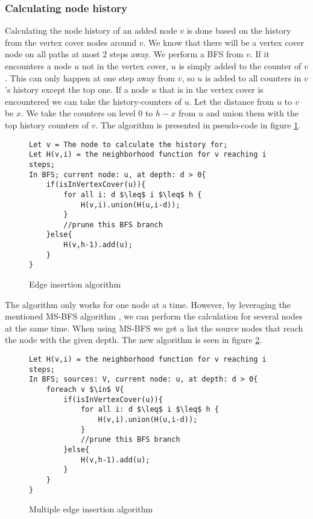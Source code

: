 \subsubsection{Calculating node history}

Calculating the node history of an added node $v$ is done based on the history from the vertex cover nodes around $v$. We know that there will be a vertex cover node on all paths at most 2 steps away. We perform a BFS from $v$. If it encounters a node $u$ not in the vertex cover, $u$ is simply added to the counter of $v$. This can only happen at one step away from $v$, so $u$ is added to all counters in $v$'s history except the top one. If a node $u$ that is in the vertex cover is encountered we can take the history-counters of $u$. Let the distance from $u$ to $v$ be $x$. We take the counters on level $0$ to $h-x$ from $u$ and union them with the top history counters of $v$.   The algorithm is presented in pseudo-code in figure \ref{fig:edge_insertion_algorithm}.

\begin{figure}[h]
    \begin{lstlisting}[mathescape]
Let v = The node to calculate the history for;
Let H(v,i) = the neighborhood function for v reaching i steps;
In BFS; current node: u, at depth: d > 0{
    if(isInVertexCover(u)){
        for all i: d $\leq$ i $\leq$ h {
            H(v,i).union(H(u,i-d));
        }
        //prune this BFS branch
    }else{
        H(v,h-1).add(u);
    }
}
    \end{lstlisting}
    \caption{Edge insertion algorithm}
    \label{fig:edge_insertion_algorithm}
\end{figure}

The algorithm only works for one node at a time. However, by leveraging the mentioned MS-BFS algorithm \cite{msbfs}, we can perform the calculation for several nodes at the same time. When using MS-BFS we get a list the source nodes that reach the node with the given depth. The new algorithm is seen in figure \ref{fig:multiple_edge_insertion_algorithm}.

\begin{figure}[h]
    \begin{lstlisting}[mathescape]
Let H(v,i) = the neighborhood function for v reaching i steps;
In BFS; sources: V, current node: u, at depth: d > 0{
    foreach v $\in$ V{
        if(isInVertexCover(u)){
            for all i: d $\leq$ i $\leq$ h {
                H(v,i).union(H(u,i-d));
            }
            //prune this BFS branch
        }else{
            H(v,h-1).add(u);
        }
    }
}
    \end{lstlisting}
    \caption{Multiple edge insertion algorithm}
    \label{fig:multiple_edge_insertion_algorithm}
\end{figure}

